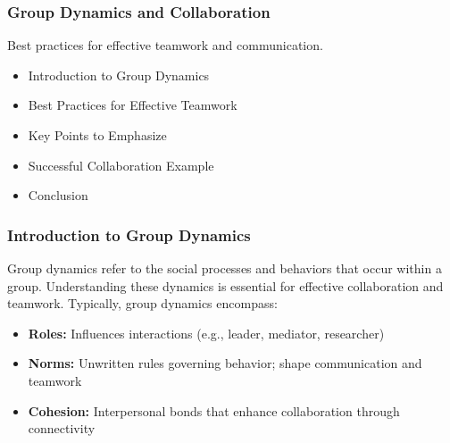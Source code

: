 \documentclass[aspectratio=169]{beamer}
\begin{document}
\begin{frame}[fragile]
    \frametitle{Group Dynamics and Collaboration}
    
    Best practices for effective teamwork and communication.
    
    \begin{itemize}
        \item Introduction to Group Dynamics
        \item Best Practices for Effective Teamwork
        \item Key Points to Emphasize
        \item Successful Collaboration Example
        \item Conclusion
    \end{itemize}
\end{frame}

\begin{frame}[fragile]
    \frametitle{Introduction to Group Dynamics}
    
    Group dynamics refer to the social processes and behaviors that occur within a group. Understanding these dynamics is essential for effective collaboration and teamwork. Typically, group dynamics encompass:
    
    \begin{itemize}
        \item \textbf{Roles:} Influences interactions (e.g., leader, mediator, researcher)
        \item \textbf{Norms:} Unwritten rules governing behavior; shape communication and teamwork
        \item \textbf{Cohesion:} Interpersonal bonds that enhance collaboration through connectivity
    \end{itemize}
\end{frame}
\end{document}

